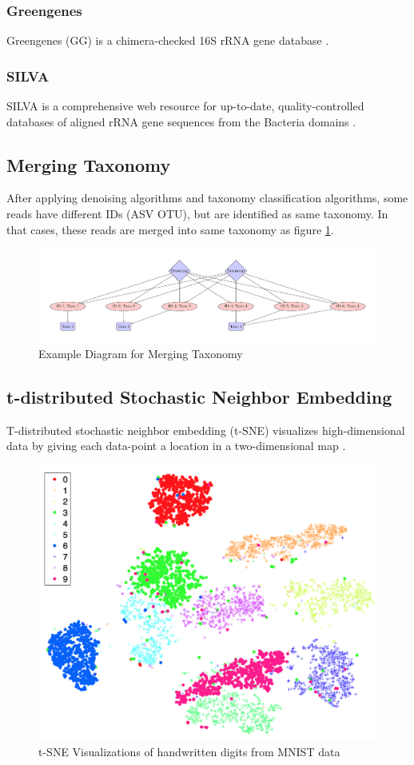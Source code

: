 \documentclass[a4paper]{article}
\begin{document}
            \subsubsection{Greengenes}
                Greengenes (GG) is a chimera-checked 16S rRNA gene database \cite{greengenes1}.

            \subsubsection{SILVA}
                SILVA is a comprehensive web resource for up-to-date, quality-controlled databases of aligned rRNA gene sequences from the Bacteria domains \cite{silva1, silva2}.

        \subsection{Merging Taxonomy}
            After applying denoising algorithms and taxonomy classification algorithms, some reads have different IDs (ASV OTU), but are identified as same taxonomy. In that cases, these reads are merged into same taxonomy as figure \ref{fig:merging}.

            \begin{figure}[p]
                \centering
                \includegraphics[width=0.5 \linewidth]{figures/tikz/merging.pdf}
                \caption{Example Diagram for Merging Taxonomy}
                \label{fig:merging}
            \end{figure}

        \subsection[t-SNE]{t-distributed Stochastic Neighbor Embedding}
            T-distributed stochastic neighbor embedding (t-SNE) visualizes high-dimensional data by giving each data-point a location in a two-dimensional map \cite{tsne1}.

            \begin{figure}[p]
                \centering
                \includegraphics[width=0.5 \linewidth]{figures/tsne.png}
                \caption{t-SNE Visualizations of handwritten digits from MNIST data \protect \cite{tsne1}}
                \label{fig:tsne}
            \end{figure}
\end{document}
